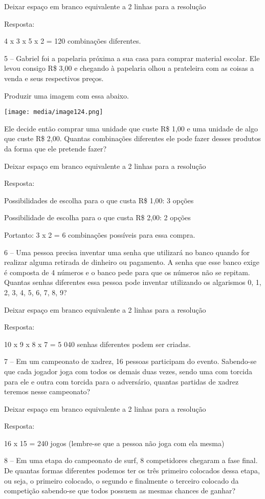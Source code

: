 Deixar espaço em branco equivalente a 2 linhas para a resolução

Resposta:

4 x 3 x 5 x 2 = 120 combinações diferentes.

5 -- Gabriel foi a papelaria próxima a sua casa para comprar material
escolar. Ele levou consigo R\$ 3,00 e chegando à papelaria olhou a
prateleira com as coisas a venda e seus respectivos preços.

Produzir uma imagem com essa abaixo.

\texttt{[image: media/image124.png]}

Ele decide então comprar uma unidade que custe R\$ 1,00 e uma unidade de
algo que custe R\$ 2,00. Quantas combinações diferentes ele pode fazer
desses produtos da forma que ele pretende fazer?

Deixar espaço em branco equivalente a 2 linhas para a resolução

Resposta:

Possibilidades de escolha para o que custa R\$ 1,00: 3 opções

Possibilidade de escolha para o que custa R\$ 2,00: 2 opções

Portanto: 3 x 2 = 6 combinações possíveis para essa compra.

6 -- Uma pessoa precisa inventar uma senha que utilizará no banco quando
for realizar alguma retirada de dinheiro ou pagamento. A senha que esse
banco exige é composta de 4 números e o banco pede para que os números
não se repitam. Quantas senhas diferentes essa pessoa pode inventar
utilizando os algarismos 0, 1, 2, 3, 4, 5, 6, 7, 8, 9?

Deixar espaço em branco equivalente a 2 linhas para a resolução

Resposta:

10 x 9 x 8 x 7 = 5 040 senhas diferentes podem ser criadas.

7 -- Em um campeonato de xadrez, 16 pessoas participam do evento.
Sabendo-se que cada jogador joga com todos os demais duas vezes, sendo
uma com torcida para ele e outra com torcida para o adversário, quantas
partidas de xadrez teremos nesse campeonato?

Deixar espaço em branco equivalente a 2 linhas para a resolução

Resposta:

16 x 15 = 240 jogos (lembre-se que a pessoa não joga com ela mesma)

8 -- Em uma etapa do campeonato de surf, 8 competidores chegaram a fase
final. De quantas formas diferentes podemos ter os três primeiro
colocados dessa etapa, ou seja, o primeiro colocado, o segundo e
finalmente o terceiro colocado da competição sabendo-se que todos
possuem as mesmas chances de ganhar?

